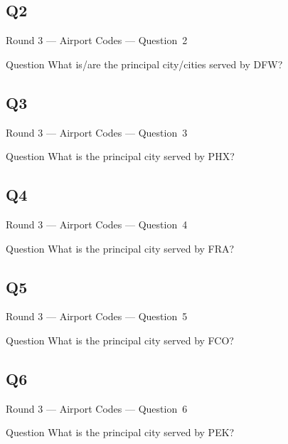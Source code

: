 \documentclass[11pt]{beamer}
\begin{document}
\subsection*{Q2}
\begin{frame}[t]{Round 3 --- Airport Codes --- \mbox{Question 2}}
\begin{block}{Question}
What is/are the principal city/cities served by DFW\@?
\end{block}
\end{frame}
\subsection*{Q3}
\begin{frame}[t]{Round 3 --- Airport Codes --- \mbox{Question 3}}
\begin{block}{Question}
What is the principal city served by PHX\@?
\end{block}
\end{frame}
\subsection*{Q4}
\begin{frame}[t]{Round 3 --- Airport Codes --- \mbox{Question 4}}
\begin{block}{Question}
What is the principal city served by FRA\@?
\end{block}
\end{frame}
\subsection*{Q5}
\begin{frame}[t]{Round 3 --- Airport Codes --- \mbox{Question 5}}
\begin{block}{Question}
What is the principal city served by FCO\@?
\end{block}
\end{frame}
\subsection*{Q6}
\begin{frame}[t]{Round 3 --- Airport Codes --- \mbox{Question 6}}
\begin{block}{Question}
What is the principal city served by PEK\@?
\end{block}
\end{frame}
\end{document}
